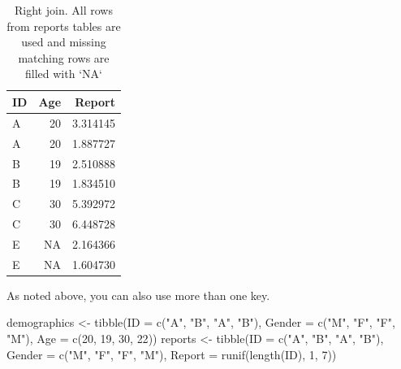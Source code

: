 \documentclass[
]{book}
\newenvironment{Shaded}{\begin{snugshade}}{\end{snugshade}}
\newcommand{\AttributeTok}[1]{\textcolor[rgb]{0.77,0.63,0.00}{#1}}
\newcommand{\DecValTok}[1]{\textcolor[rgb]{0.00,0.00,0.81}{#1}}
\newcommand{\FunctionTok}[1]{\textcolor[rgb]{0.00,0.00,0.00}{#1}}
\newcommand{\NormalTok}[1]{#1}
\newcommand{\OtherTok}[1]{\textcolor[rgb]{0.56,0.35,0.01}{#1}}
\newcommand{\StringTok}[1]{\textcolor[rgb]{0.31,0.60,0.02}{#1}}
\begin{document}
\begin{table}

\caption{\label{tab:unnamed-chunk-188}Right join. All rows from reports tables are used and missing matching rows are filled with `NA`}
\centering
\begin{tabular}[t]{l|r|r}
\hline
ID & Age & Report\\
\hline
A & 20 & 3.314145\\
\hline
A & 20 & 1.887727\\
\hline
B & 19 & 2.510888\\
\hline
B & 19 & 1.834510\\
\hline
C & 30 & 5.392972\\
\hline
C & 30 & 6.448728\\
\hline
E & NA & 2.164366\\
\hline
E & NA & 1.604730\\
\hline
\end{tabular}
\end{table}

As noted above, you can also use more than one key.

\begin{Shaded}
\begin{Highlighting}[]
\NormalTok{demographics }\OtherTok{\textless{}{-}} \FunctionTok{tibble}\NormalTok{(}\AttributeTok{ID =} \FunctionTok{c}\NormalTok{(}\StringTok{"A"}\NormalTok{, }\StringTok{"B"}\NormalTok{, }\StringTok{"A"}\NormalTok{, }\StringTok{"B"}\NormalTok{),}
                       \AttributeTok{Gender =} \FunctionTok{c}\NormalTok{(}\StringTok{"M"}\NormalTok{, }\StringTok{"F"}\NormalTok{, }\StringTok{"F"}\NormalTok{, }\StringTok{"M"}\NormalTok{),}
                       \AttributeTok{Age =} \FunctionTok{c}\NormalTok{(}\DecValTok{20}\NormalTok{, }\DecValTok{19}\NormalTok{, }\DecValTok{30}\NormalTok{, }\DecValTok{22}\NormalTok{))}
\NormalTok{reports }\OtherTok{\textless{}{-}} \FunctionTok{tibble}\NormalTok{(}\AttributeTok{ID =} \FunctionTok{c}\NormalTok{(}\StringTok{"A"}\NormalTok{, }\StringTok{"B"}\NormalTok{, }\StringTok{"A"}\NormalTok{, }\StringTok{"B"}\NormalTok{),}
                  \AttributeTok{Gender =} \FunctionTok{c}\NormalTok{(}\StringTok{"M"}\NormalTok{, }\StringTok{"F"}\NormalTok{, }\StringTok{"F"}\NormalTok{, }\StringTok{"M"}\NormalTok{),}
                  \AttributeTok{Report =} \FunctionTok{runif}\NormalTok{(}\FunctionTok{length}\NormalTok{(ID), }\DecValTok{1}\NormalTok{, }\DecValTok{7}\NormalTok{))}
\end{Highlighting}
\end{Shaded}
\end{document}
